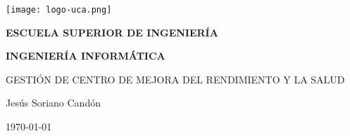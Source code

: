 


\begin{titlepage}

  \begin{center}

    \texttt{[image: logo-uca.png]} \\
    
    \vspace{2.5cm}
    
    \LARGE{\textbf{ESCUELA SUPERIOR DE INGENIERÍA}} \\
    
    \vspace{1.0cm}
    
    \Large{\textbf{INGENIERÍA INFORMÁTICA}} \\
    
    \vspace{3.0cm}
    
    \Large{GESTIÓN DE CENTRO DE MEJORA DEL RENDIMIENTO Y LA SALUD} \\
    
    \vspace{2.5cm}
    
    \Large{Jesús Soriano Candón} \\
  
    \vspace{0.5cm}

    \large{\today}
    
  \end{center}
\end{titlepage}
